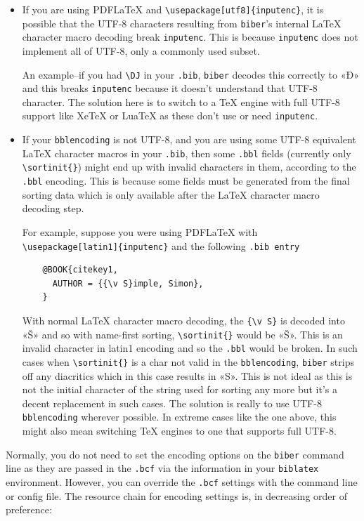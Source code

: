 \documentclass{ltxdockit}
\begin{document}
\begin{itemize}
\item If you are using PDFLaTeX and \verb+\usepackage[utf8]{inputenc}+, it
  is possible that the UTF-8 characters resulting from \verb+biber+'s
  internal LaTeX character macro decoding break \verb+inputenc+. This
  is because \verb+inputenc+ does not implement all of UTF-8, only a
  commonly used subset. 

  An example--if you had \verb+\DJ+ in your \verb+.bib+,
  \verb+biber+ decodes this correctly to «Đ» and this breaks \verb+inputenc+
  because it doesn't understand that UTF-8 character. The solution
  here is to switch to a TeX engine with full UTF-8 support like XeTeX or
  LuaTeX as these don't use or need \verb+inputenc+.
\item If your \verb+bblencoding+ is not UTF-8, and you are using some
  UTF-8 equivalent LaTeX character macros in your \verb+.bib+, then
  some \verb+.bbl+ fields (currently only \verb+\sortinit{}+) might
  end up with invalid characters in them, according to the \verb+.bbl+
  encoding. This is because some fields must be generated from the
  final sorting data which is only available after the LaTeX character
  macro decoding step.

  For example, suppose you were using PDFLaTeX with\\
  \verb+\usepackage[latin1]{inputenc}+ and the following
  \verb+.bib entry+

  \begin{verbatim}
    @BOOK{citekey1,
      AUTHOR = {{\v S}imple, Simon},
    }
  \end{verbatim}

  \noindent With normal LaTeX character macro decoding, the
  \verb+{\v S}+ is decoded into «Š» and so with name-first sorting,
  \verb+\sortinit{}+ would be «Š». This is an invalid character in
  latin1 encoding and so the \verb+.bbl+ would be broken. In such
  cases when \verb+\sortinit{}+ is a char not valid in the
  \verb+bblencoding+, \verb+biber+ strips off any diacritics which in
  this case results in «S». This is not ideal as this is not the
  initial character of the string used for sorting any more but it's a
  decent replacement in such cases. The solution is really
  to use UTF-8 \verb+bblencoding+ wherever possible. In extreme cases like
  the one above, this might also mean switching TeX engines to one that
  supports full UTF-8.
\end{itemize}

\noindent Normally, you do not need to set the encoding options on the
\verb+biber+ command line as they are passed in the \verb+.bcf+ via
the information in your \verb+biblatex+ environment. However, you can
override the \verb+.bcf+ settings with the command line or config
file. The resource chain for encoding settings is, in decreasing order
of preference:\\[2ex]
\end{document}
